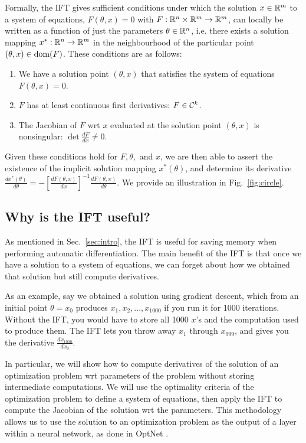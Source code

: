 \documentclass[11pt]{article}
\begin{document}
Formally, the IFT gives sufficient conditions under which the solution $x\in\mathbb{R}^m$
to a system of equations, $F(\theta, x) = 0$ with $F: \mathbb{R}^n\times\mathbb{R}^m\to\mathbb{R}^m$,
can locally be written as a function of just the parameters $\theta\in\mathbb{R}^n$,
i.e. there exists a solution mapping $x^*:\mathbb{R}^n\to\mathbb{R}^m$
in the neighbourhood of the particular point $(\theta,x)\in\mathrm{dom }(F)$.
These conditions are as follows:
\begin{enumerate}
\item We have a solution point $(\theta, x)$ that satisfies the system of equations
    $F(\theta, x) = 0$.
\item $F$ has at least continuous first derivatives: $F \in \mathcal{C}^k$.
\item The Jacobian of $F$ wrt $x$ evaluated at the solution point $(\theta,x)$ is nonsingular:
    $\det \frac{d F}{d x} \neq 0$.
\end{enumerate}
Given these conditions hold for $F,\theta,$ and $x$, we are then
able to assert the existence of the implicit solution mapping $x^*(\theta)$,
and determine its derivative
$\frac{d x^*(\theta)}{d\theta} = -[\frac{dF(\theta,x)}{dx}]^{-1}
    \frac{d F(\theta,x)}{d\theta}$.
We provide an illustration in Fig.~\ref{fig:circle}.

\subsection{Why is the IFT useful?}
As mentioned in Sec.~\ref{sec:intro}, the IFT is useful for saving memory when performing
automatic differentiation.
The main benefit of the IFT is that once we have a solution to a system of equations,
we can forget about how we obtained that solution but still compute derivatives.

As an example, say we obtained a solution using gradient descent,
which from an initial point $\theta = x_0$
produces $x_1, x_2, ..., x_{1000}$ if you run it for 1000 iterations.
Without the IFT, you would have to store all 1000 $x$'s
and the computation used to produce them.
The IFT lets you throw away $x_1$ through $x_{999}$, and gives you the derivative
$\frac{dx_{1000}}{dx_0}$.

In particular, we will show how to compute derivatives of the solution of an optimization problem
wrt parameters of the problem without storing intermediate computations.
We will use the optimality criteria of the optimization problem to define a system of equations,
then apply the IFT to compute the Jacobian of the solution wrt the parameters.
This methodology allows us to use the solution to an optimization problem
as the output of a layer within a neural network,
as done in OptNet \citep{optnet}.
\end{document}
